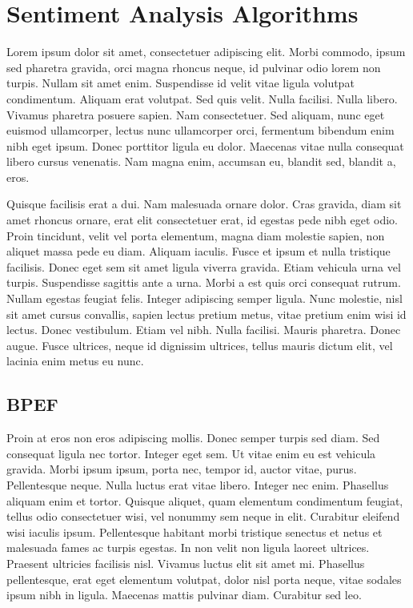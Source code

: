 \section{Sentiment Analysis Algorithms}

Lorem ipsum dolor sit amet, consectetuer adipiscing elit. Morbi commodo, ipsum sed pharetra gravida, orci magna rhoncus neque, id pulvinar odio lorem non turpis. Nullam sit amet enim. Suspendisse id velit vitae ligula volutpat condimentum. Aliquam erat volutpat. Sed quis velit. Nulla facilisi. Nulla libero. Vivamus pharetra posuere sapien. Nam consectetuer. Sed aliquam, nunc eget euismod ullamcorper, lectus nunc ullamcorper orci, fermentum bibendum enim nibh eget ipsum. Donec porttitor ligula eu dolor. Maecenas vitae nulla consequat libero cursus venenatis. Nam magna enim, accumsan eu, blandit sed, blandit a, eros.





Quisque facilisis erat a dui. Nam malesuada ornare dolor. Cras gravida, diam sit amet rhoncus ornare, erat elit consectetuer erat, id egestas pede nibh eget odio. Proin tincidunt, velit vel porta elementum, magna diam molestie sapien, non aliquet massa pede eu diam. Aliquam iaculis. Fusce et ipsum et nulla tristique facilisis. Donec eget sem sit amet ligula viverra gravida. Etiam vehicula urna vel turpis. Suspendisse sagittis ante a urna. Morbi a est quis orci consequat rutrum. Nullam egestas feugiat felis. Integer adipiscing semper ligula. Nunc molestie, nisl sit amet cursus convallis, sapien lectus pretium metus, vitae pretium enim wisi id lectus. Donec vestibulum. Etiam vel nibh. Nulla facilisi. Mauris pharetra. Donec augue. Fusce ultrices, neque id dignissim ultrices, tellus mauris dictum elit, vel lacinia enim metus eu nunc.

\subsection{BPEF}

Proin at eros non eros adipiscing mollis. Donec semper turpis sed diam. Sed consequat ligula nec tortor. Integer eget sem. Ut vitae enim eu est vehicula gravida. Morbi ipsum ipsum, porta nec, tempor id, auctor vitae, purus. Pellentesque neque. Nulla luctus erat vitae libero. Integer nec enim. Phasellus aliquam enim et tortor. Quisque aliquet, quam elementum condimentum feugiat, tellus odio consectetuer wisi, vel nonummy sem neque in elit. Curabitur eleifend wisi iaculis ipsum. Pellentesque habitant morbi tristique senectus et netus et malesuada fames ac turpis egestas. In non velit non ligula laoreet ultrices. Praesent ultricies facilisis nisl. Vivamus luctus elit sit amet mi. Phasellus pellentesque, erat eget elementum volutpat, dolor nisl porta neque, vitae sodales ipsum nibh in ligula. Maecenas mattis pulvinar diam. Curabitur sed leo.

